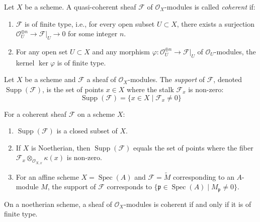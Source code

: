 \documentclass[12pt]{article}
\begin{document}
\begin{definition}
    Let $X$ be a scheme. A quasi-coherent sheaf $\mathcal{F}$ of $\mathcal{O}_X$-modules is called \textit{coherent} if:
    \begin{enumerate}
        \item $\mathcal{F}$ is of finite type, i.e., for every open subset $U \subset X$, there exists a surjection $\mathcal{O}_U^{\oplus n} \to \mathcal{F}|_U \to 0$ for some integer $n$.
        \item For any open set $U \subset X$ and any morphism $\varphi: \mathcal{O}_U^{\oplus n} \to \mathcal{F}|_U$ of $\mathcal{O}_U$-modules, the kernel $\ker \varphi$ is of finite type.
    \end{enumerate}
\end{definition}

\begin{definition}
    Let $X$ be a scheme and $\mathcal{F}$ a sheaf of $\mathcal{O}_X$-modules. The \textit{support} of $\mathcal{F}$, denoted $\operatorname{Supp}(\mathcal{F})$, is the set of points $x \in X$ where the stalk $\mathcal{F}_x$ is non-zero:
    \[
        \operatorname{Supp}(\mathcal{F}) = \{x \in X \mid \mathcal{F}_x \neq 0\}
    \]
\end{definition}

\begin{proposition}
    For a coherent sheaf $\mathcal{F}$ on a scheme $X$:
    \begin{enumerate}
        \item $\operatorname{Supp}(\mathcal{F})$ is a closed subset of $X$.
        \item If $X$ is Noetherian, then $\operatorname{Supp}(\mathcal{F})$ equals the set of points where the fiber $\mathcal{F}_x \otimes_{\mathcal{O}_{X,x}} \kappa(x)$ is non-zero.
        \item For an affine scheme $X = \operatorname{Spec}(A)$ and $\mathcal{F} = \widetilde{M}$ corresponding to an $A$-module $M$, the support of $\mathcal{F}$ corresponds to $\{\mathfrak{p} \in \operatorname{Spec}(A) \mid M_{\mathfrak{p}} \neq 0\}$.
    \end{enumerate}
\end{proposition}

\begin{remark}
    On a noetherian scheme, a sheaf of $\mathcal{O}_X$-modules is coherent if and only if it is of finite type.
\end{remark}
\end{document}
